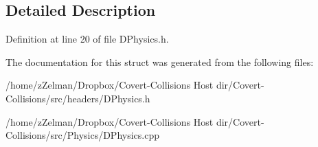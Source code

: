 \subsection{Detailed Description}


Definition at line 20 of file D\-Physics.\-h.



The documentation for this struct was generated from the following files\-:\begin{DoxyCompactItemize}
\item 
/home/z\-Zelman/\-Dropbox/\-Covert-\/\-Collisions Host dir/\-Covert-\/\-Collisions/src/headers/D\-Physics.\-h\item 
/home/z\-Zelman/\-Dropbox/\-Covert-\/\-Collisions Host dir/\-Covert-\/\-Collisions/src/\-Physics/D\-Physics.\-cpp\end{DoxyCompactItemize}
